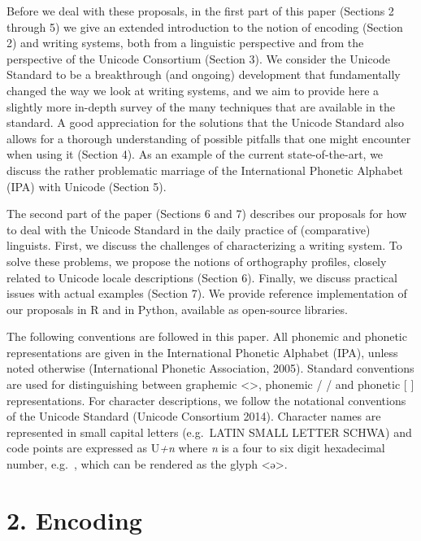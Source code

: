 Before we deal with these proposals, in the first part of this paper (Sections 2 through 5) we give an extended introduction to the notion of encoding (Section 2) and writing systems, both from a linguistic perspective and from the perspective of the Unicode Consortium (Section 3). We consider the Unicode Standard to be a breakthrough (and ongoing) development that fundamentally changed the way we look at writing systems, and we aim to provide here a slightly more in-depth survey of the many techniques that are available in the standard. A good appreciation for the solutions that the Unicode Standard also allows for a thorough understanding of possible pitfalls that one might encounter when using it (Section 4). As an example of the current state-of-the-art, we discuss the rather problematic marriage of the International Phonetic Alphabet (IPA) with Unicode (Section 5).

The second part of the paper (Sections 6 and 7) describes our proposals for how to deal with the Unicode Standard in the daily practice of (comparative) linguists. First, we discuss the challenges of characterizing a writing system. To solve these problems, we propose the notions of orthography profiles, closely related to Unicode locale descriptions (Section 6). Finally, we discuss practical issues with actual examples (Section 7). We provide reference implementation of our proposals in R and in Python, available as open-source libraries.

The following conventions are followed in this paper. All phonemic and phonetic representations are given in the International Phonetic Alphabet (IPA), unless noted otherwise (International Phonetic Association, 2005). Standard conventions are used for distinguishing between graphemic <\textgreater{}, phonemic / / and phonetic {[} {]} representations. For character descriptions, we follow the notational conventions of the Unicode Standard (Unicode Consortium 2014). Character names are represented in small capital letters (e.g.~LATIN SMALL LETTER SCHWA) and code points are expressed as U\emph{+n} where \emph{n} is a four to six digit hexadecimal number, e.g.~, which can be rendered as the glyph <ə>.

\section{2. Encoding}\label{encoding}

